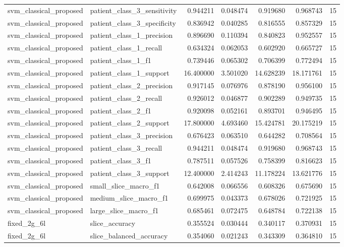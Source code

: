 \begin{tabular}{llrrrrr}
svm_classical_proposed & patient_class_3_sensitivity & 0.944211 & 0.048474 & 0.919680 & 0.968743 & 15 \\
svm_classical_proposed & patient_class_3_specificity & 0.836942 & 0.040285 & 0.816555 & 0.857329 & 15 \\
svm_classical_proposed & patient_class_1_precision & 0.896690 & 0.110394 & 0.840823 & 0.952557 & 15 \\
svm_classical_proposed & patient_class_1_recall & 0.634324 & 0.062053 & 0.602920 & 0.665727 & 15 \\
svm_classical_proposed & patient_class_1_f1 & 0.739446 & 0.065302 & 0.706399 & 0.772494 & 15 \\
svm_classical_proposed & patient_class_1_support & 16.400000 & 3.501020 & 14.628239 & 18.171761 & 15 \\
svm_classical_proposed & patient_class_2_precision & 0.917145 & 0.076976 & 0.878190 & 0.956100 & 15 \\
svm_classical_proposed & patient_class_2_recall & 0.926012 & 0.046877 & 0.902289 & 0.949735 & 15 \\
svm_classical_proposed & patient_class_2_f1 & 0.920098 & 0.052161 & 0.893701 & 0.946495 & 15 \\
svm_classical_proposed & patient_class_2_support & 17.800000 & 4.693460 & 15.424781 & 20.175219 & 15 \\
svm_classical_proposed & patient_class_3_precision & 0.676423 & 0.063510 & 0.644282 & 0.708564 & 15 \\
svm_classical_proposed & patient_class_3_recall & 0.944211 & 0.048474 & 0.919680 & 0.968743 & 15 \\
svm_classical_proposed & patient_class_3_f1 & 0.787511 & 0.057526 & 0.758399 & 0.816623 & 15 \\
svm_classical_proposed & patient_class_3_support & 12.400000 & 2.414243 & 11.178224 & 13.621776 & 15 \\
svm_classical_proposed & small_slice_macro_f1 & 0.642008 & 0.066556 & 0.608326 & 0.675690 & 15 \\
svm_classical_proposed & medium_slice_macro_f1 & 0.699975 & 0.043373 & 0.678026 & 0.721925 & 15 \\
svm_classical_proposed & large_slice_macro_f1 & 0.685461 & 0.072475 & 0.648784 & 0.722138 & 15 \\
fixed_2g_6l & slice_accuracy & 0.355524 & 0.030444 & 0.340117 & 0.370931 & 15 \\
fixed_2g_6l & slice_balanced_accuracy & 0.354060 & 0.021243 & 0.343309 & 0.364810 & 15 \\

\end{tabular}
